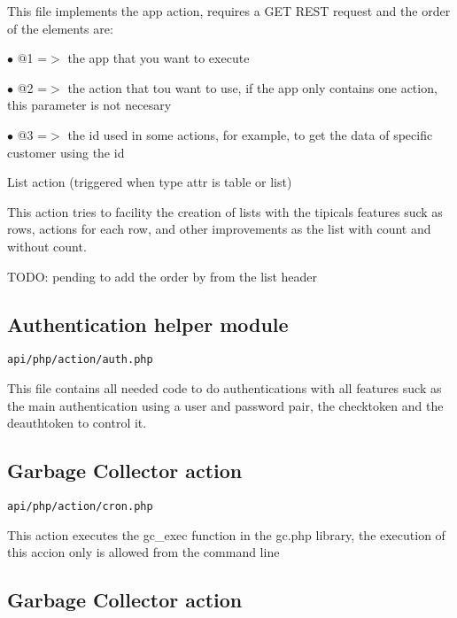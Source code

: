 \documentclass[a4paper]{article}
\begin{document}
This file implements the app action, requires a GET REST request
and the order of the elements are:

\begin{compactitem}
\item[\color{myblue}$\bullet$] @1 =$>$ the app that you want to execute
\item[\color{myblue}$\bullet$] @2 =$>$ the action that tou want to use, if the app only contains
      one action, this parameter is not necesary
\item[\color{myblue}$\bullet$] @3 =$>$ the id used in some actions, for example, to get the data
      of specific customer using the id
\end{compactitem}

List action (triggered when type attr is table or list)

This action tries to facility the creation of lists with the tipicals
features suck as rows, actions for each row, and other improvements as
the list with count and without count.

TODO: pending to add the order by from the list header

\hypertarget{toc4}{}
\subsection{Authentication helper module}

\begin{lstlisting}
api/php/action/auth.php
\end{lstlisting}

This file contains all needed code to do authentications with all features suck as the
main authentication using a user and password pair, the checktoken and the deauthtoken
to control it.

\hypertarget{toc5}{}
\subsection{Garbage Collector action}

\begin{lstlisting}
api/php/action/cron.php
\end{lstlisting}

This action executes the gc\_exec function in the gc.php library, the execution
of this accion only is allowed from the command line

\hypertarget{toc6}{}
\subsection{Garbage Collector action}
\end{document}

